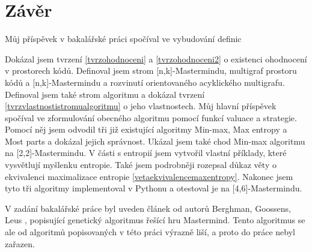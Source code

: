 \chapter*{Závěr}

Můj příspěvek v bakalářské práci spočíval ve vybudování definic 


Dokázal jsem tvrzení \ref{tvrzohodnoceni} a \ref{tvrzohodnoceni2} o existenci ohodnocení v prostorech kódů. Definoval jsem strom [n,k]-Mastermindu, multigraf prostoru kódů a [n,k]-Mastermindu a rozvinutí orientovaného acyklického multigrafu. Definoval jsem také strom algoritmu a dokázal tvrzení \ref{tvrzvlastnostistromualgoritmu} o jeho vlastnostech. Můj hlavní příspěvek spočíval ve zformulování obecného algoritmu pomocí funkcí valuace a strategie. Pomocí něj jsem odvodil tři již existující algoritmy Min-max, Max entropy a Most parts a dokázal jejich správnost. Ukázal jsem také chod Min-max algoritmu na [2,2]-Mastermindu. V části s entropií jsem vytvořil vlastní příklady, které vysvětlují myšlenku entropie. Také jsem podrobněji rozepsal důkaz věty o ekvivalenci maximalizace entropie \ref{vetaekvivalencemaxentropy}. Nakonec jsem tyto tři algoritmy implementoval v Pythonu a otestoval je na [4,6]-Mastermindu. 

V zadání bakalářské práce byl uveden článek od autorů Berghman, Goossens, Leus \cite{BERGHMAN20091880}, popisující genetický algoritmus řešící hru Mastermind. Tento algoritmus se ale od algoritmů popisovaných v této práci výrazně liší, a proto do práce nebyl zařazen. 

